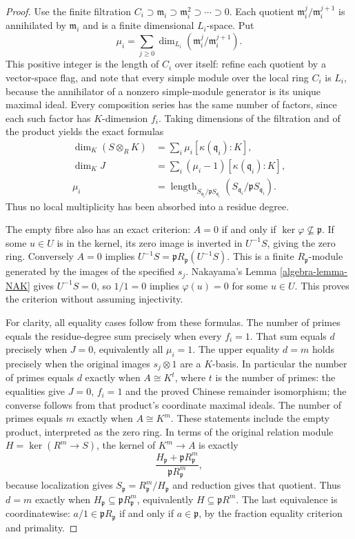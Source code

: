 \begin{proof}
Use the finite filtration
$C_i\supset\mathfrak m_i\supset\mathfrak m_i^2\supset\cdots\supset0$.
Each quotient $\mathfrak m_i^j/\mathfrak m_i^{j+1}$ is annihilated
by $\mathfrak m_i$ and is a finite dimensional $L_i$-space.
Put
$$
\mu_i=\sum_{j\geq0}
\dim_{L_i}(\mathfrak m_i^j/\mathfrak m_i^{j+1}).
$$
This positive integer is the length of $C_i$ over itself:
refine each quotient by a vector-space flag, and note that every
simple module over the local ring $C_i$ is $L_i$, because the
annihilator of a nonzero simple-module generator is its unique
maximal ideal. Every composition series has the same number of
factors, since each such factor has $K$-dimension $f_i$.
Taking dimensions of the filtration and of the product yields
the exact formulas
$$
\begin{aligned}
\dim_K(S\otimes_RK)&=\sum_i\mu_i[\kappa(\mathfrak q_i):K],\\
\dim_KJ&=\sum_i(\mu_i-1)[\kappa(\mathfrak q_i):K],\\
\mu_i&=\operatorname{length}_{S_{\mathfrak q_i}/\mathfrak pS_{\mathfrak q_i}}
 (S_{\mathfrak q_i}/\mathfrak pS_{\mathfrak q_i}).
\end{aligned}
$$
Thus no local multiplicity has been absorbed into a residue degree.

The empty fibre also has an exact criterion:
$A=0$ if and only if $\ker\varphi\not\subseteq\mathfrak p$.
If some $u\in U$ is in the kernel, its zero image is inverted
in $U^{-1}S$, giving the zero ring. Conversely $A=0$ implies
$U^{-1}S=\mathfrak pR_{\mathfrak p}(U^{-1}S)$.
This is a finite $R_{\mathfrak p}$-module generated by the images
of the specified $s_j$. Nakayama's Lemma \ref{algebra-lemma-NAK} gives
$U^{-1}S=0$, so $1/1=0$ implies $\varphi(u)=0$ for some
$u\in U$. This proves the criterion without assuming injectivity.

For clarity, all equality cases follow from these formulas.
The number of primes equals the residue-degree sum precisely
when every $f_i=1$. That sum equals $d$ precisely when $J=0$,
equivalently all $\mu_i=1$. The upper equality $d=m$ holds
precisely when the original images $s_j\otimes1$ are a $K$-basis.
In particular the number of primes equals $d$ exactly when
$A\cong K^t$, where $t$ is the number of primes: the equalities
give $J=0$, $f_i=1$ and the proved Chinese remainder isomorphism;
the converse follows from that product's coordinate maximal ideals.
The number of primes equals $m$ exactly when $A\cong K^m$.
These statements include the empty product, interpreted as the zero ring.
In terms of the original relation module
$H=\ker(R^m\to S)$, the kernel of $K^m\to A$ is exactly
$$
\frac{H_{\mathfrak p}+\mathfrak pR_{\mathfrak p}^m}
{\mathfrak pR_{\mathfrak p}^m},
$$
because localization gives $S_{\mathfrak p}=R_{\mathfrak p}^m/H_{\mathfrak p}$
and reduction gives that quotient. Thus $d=m$ exactly when
$H_{\mathfrak p}\subseteq\mathfrak pR_{\mathfrak p}^m$, equivalently
$H\subseteq\mathfrak pR^m$. The last equivalence is coordinatewise:
$a/1\in\mathfrak pR_{\mathfrak p}$ if and only if $a\in\mathfrak p$,
by the fraction equality criterion and primality.


\end{proof}
